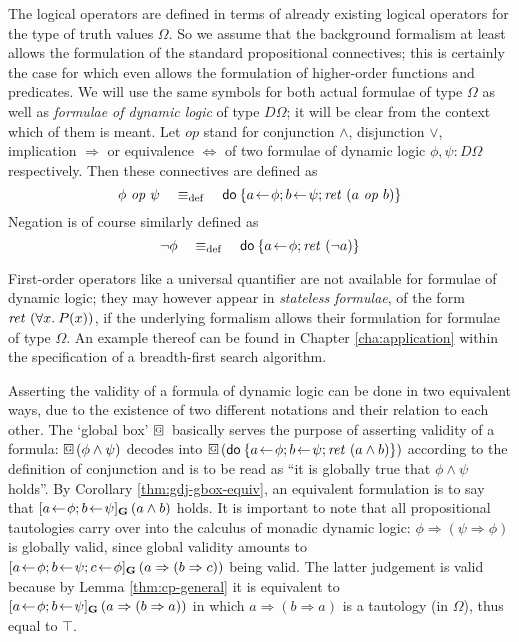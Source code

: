 The logical operators are defined in terms of already existing logical operators
for the type of truth values $\Omega$. So we assume that the background formalism at
least allows the formulation of the standard propositional connectives; this is
certainly the case for \IsabelleHOL which even allows the formulation of
higher-order functions and predicates. We will use the same symbols for both
actual formulae of type $\Omega$ as well as \emph{formulae of dynamic logic} of type
$D\Omega$; it will be clear from the context which of them is meant. Let
$\mathit{op}$ stand for conjunction $\land$, disjunction $\lor$, implication $\Rightarrow$ or
equivalence $\iff$ of two formulae of dynamic logic $\phi, \psi: D\Omega$ respectively. Then
these connectives are defined as
\begin{equation} \label{eq:defn-log-conn}
 \phi\ \mathit{op}\ \psi \quad\equiv_{\mathrm{def}}\quad \mathsf{do}\: \{a\!\gets\! \phi; b\!\gets\! \psi; \mathit{ret}~(a\ \mathit{op}\ b)\} 
\end{equation}
Negation is of course similarly defined  as
\[ \lnot \phi \quad \equiv_{\mathrm{def}} \quad \mathsf{do}\: \{a\!\gets\! \phi; \mathit{ret}~(\lnot a)\} \]

First-order operators like a universal quantifier are not available for formulae
of dynamic logic; they may however appear in \emph{stateless formulae}, \EG of
the form $\mathit{ret}~(\forall x.\: P(x))$, if the underlying formalism allows their
formulation for formulae of type $\Omega$. An example thereof can be found in Chapter
\ref{cha:application} within the specification of a breadth-first search
algorithm.

Asserting the validity of a formula of dynamic logic can be done in two
equivalent ways, due to the existence of two different notations and their
relation to each other. The `global box' $\gbox$ basically serves the purpose of
asserting validity of a formula: $\gbox(\phi\land\psi)$ decodes into
$\gbox(\DoStmt{a\leteq \phi; b\leteq \psi; \ret~(a\land b)})$ according to the definition
of conjunction and is to be read as ``it is globally true that $\phi \land \psi$ holds''.
By Corollary \ref{thm:gdj-gbox-equiv}, an equivalent formulation is to say that
$[a\!\gets\! \phi; b\!\gets\! \psi]_\mathbf{G}\,(a\land b)$ holds. It is important to note that all
propositional tautologies carry over into the calculus of monadic dynamic logic:
$\phi \Rightarrow (\psi \Rightarrow \phi)$ is globally valid, since global validity amounts to $[a\!\gets\!
  \phi; b\!\gets\! \psi; c\!\gets\! \phi]_\mathbf{G}\,(a \Rightarrow (b \Rightarrow c))$ being valid. The latter judgement is
valid because by Lemma \ref{thm:cp-general} it is equivalent to $[a\!\gets\! \phi;
  b\!\gets\! \psi]_\mathbf{G}\,(a \Rightarrow (b \Rightarrow a))$ in which $a \Rightarrow (b \Rightarrow a)$ is a tautology (in $\Omega$), thus
equal to $\top$.


